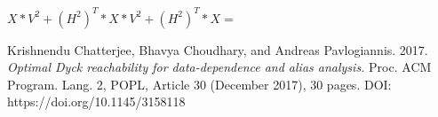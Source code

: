 \documentclass[12pt]{article}  %
\theoremstyle{definition}
\theoremstyle{remark}
\begin{document}
$X*V^2 + (H^2)^T * X * V^2 + (H^2)^T * X =$



\begin{thebibliography}{9}

Krishnendu Chatterjee, Bhavya Choudhary, and Andreas Pavlogiannis. 
2017. 
\emph{Optimal Dyck reachability for data-dependence and alias analysis.}
Proc. ACM Program. Lang. 2, POPL, Article 30 (December 2017), 30 pages. DOI: 
https://doi.org/10.1145/3158118




\end{thebibliography}
\end{document}
